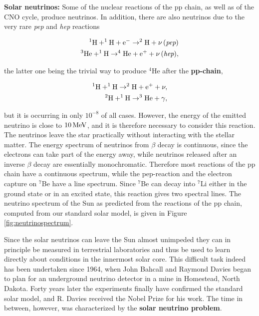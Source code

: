 \documentclass[a4paper,10pt]{article}
\begin{document}
{\noindent}\textbf{Solar neutrinos:} Some of the nuclear reactions of the pp chain, as well as of the CNO cycle, produce neutrinos. In addition, there are also neutrinos due to the very rare \textit{pep} and \textit{hep} reactions

\begin{align*}
    {\rm ^1H+^1H+e^- \rightarrow ^2H+\nu\,(\textit{pep})} \\
    {\rm ^3He+^1H \rightarrow ^4He+e^++\nu\,(\textit{hep})},
\end{align*}

{\noindent}the latter one being the trivial way to produce $^4$He after the \textbf{pp-chain},

\begin{align*}
    {\rm ^1H+^1H \rightarrow ^2H+e^++\nu,} \\
    {\rm ^2H+^1H \rightarrow ^3He+\gamma},
\end{align*}

{\noindent}but it is occurring in only $10^{-8}$ of all cases. However, the energy of the emitted neutrino is close to $10\,{\rm MeV}$, and it is therefore necessary to consider this reaction. The neutrinos leave the star practically without interacting with the stellar matter. The energy spectrum of neutrinos from $\beta$ decay is continuous, since the electrons can take part of the energy away, while neutrinos released after an inverse $\beta$ decay are essentially monochromatic. Therefore most reactions of the pp chain have a continuous spectrum, while the pep-reaction and the electron capture on $^7$Be have a line spectrum. Since $^7$Be can decay into $^7$Li either in the ground state or in an excited state, this reaction gives two spectral lines. The neutrino spectrum of the Sun as predicted from the reactions of the pp chain, computed from our standard solar model, is given in Figure \ref{fig:neutrinospectrum}.

{\noindent}Since the solar neutrinos can leave the Sun almost unimpeded they can in principle be measured in terrestrial laboratories and thus be used to learn directly about conditions in the innermost solar core. This difficult task indeed has been undertaken since 1964, when John Bahcall and Raymond Davies began to plan for an underground neutrino detector in a mine in Homestead, North Dakota. Forty years later the experiments finally have confirmed the standard solar model, and R. Davies received the Nobel Prize for his work. The time in between, however, was characterized by the \textbf{solar neutrino problem}.
\end{document}
